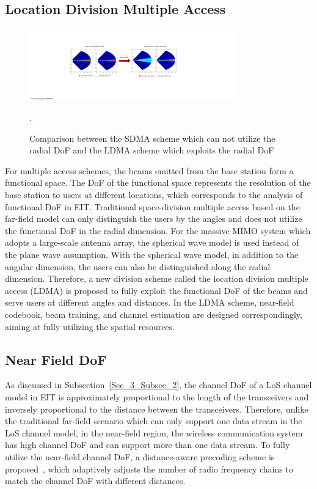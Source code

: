 \documentclass[journal,twocolumn]{IEEEtran}
\begin{document}
\subsection{Location Division Multiple Access}
\begin{figure}
	\centering 
	\includegraphics[width=0.8\textwidth]{figures/LDMA.pdf} 
	\caption{Comparison between the SDMA scheme which can not utilize the radial DoF and the LDMA scheme which exploits the radial DoF~\cite{wu2022multiple} }. 
	\label{fig:LDMA}
\end{figure}
For multiple access schemes, the beams emitted from the base station form a functional space. The DoF of the functional space represents the resolution of the base station to users at different locations, which corresponds to the analysis of functional DoF in EIT. 
Traditional space-division multiple access based on the far-field model can only distinguish the users by the angles and does not utilize the functional DoF in the radial dimension. 
For the massive MIMO system which adopts a large-scale antenna array, the spherical wave model is used instead of the plane wave assumption. 
With the spherical wave model, in addition to the angular dimension, the users can also be distinguished along the radial dimension. 
Therefore, a new division scheme called the location division multiple access (LDMA) is proposed to fully exploit the functional DoF of the beams and serve users at different angles and distances. 
In the LDMA scheme, near-field codebook, beam training, and channel estimation are designed correspondingly, aiming at fully utilizing the spatial resources. 

\subsection{Near Field DoF}
As discussed in Subsection~\ref{Sec_3_Subsec_2}, the channel DoF of a LoS channel model in EIT is approximately proportional to the length of the transceivers and inversely proportional to the distance between the transceivers. Therefore, unlike the traditional far-field scenario which can only support one data stream in the LoS channel model, in the near-field region, the wireless communication system has high channel DoF and can support more than one data stream. To fully utilize the near-field channel DoF, a distance-aware precoding scheme is proposed~\cite{wu2022multiple}, which adaptively adjusts the number of radio frequency chains to match the channel DoF with different distances.   
\end{document}
